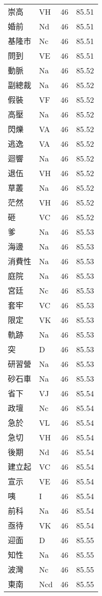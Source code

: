 \documentclass[twocolumn]{book}
\begin{document}
\begin{supertabular}{llrr}
崇高 & VH & 46 &  85.51\\
婚前 & Nd & 46 &  85.51\\
基隆市 & Nc & 46 &  85.51\\
問到 & VE & 46 &  85.51\\
動脈 & Na & 46 &  85.52\\
副總裁 & Na & 46 &  85.52\\
假裝 & VF & 46 &  85.52\\
高壓 & Na & 46 &  85.52\\
閃爍 & VA & 46 &  85.52\\
逃逸 & VA & 46 &  85.52\\
迴響 & Na & 46 &  85.52\\
退伍 & VH & 46 &  85.52\\
草叢 & Na & 46 &  85.52\\
茫然 & VH & 46 &  85.52\\
砸 & VC & 46 &  85.52\\
爹 & Na & 46 &  85.53\\
海邊 & Na & 46 &  85.53\\
消費性 & Na & 46 &  85.53\\
庭院 & Na & 46 &  85.53\\
宮廷 & Nc & 46 &  85.53\\
套牢 & VC & 46 &  85.53\\
限定 & VK & 46 &  85.53\\
軌跡 & Na & 46 &  85.53\\
突 & D & 46 &  85.53\\
研習營 & Na & 46 &  85.53\\
砂石車 & Na & 46 &  85.53\\
省下 & VJ & 46 &  85.54\\
政壇 & Nc & 46 &  85.54\\
急於 & VL & 46 &  85.54\\
急切 & VH & 46 &  85.54\\
後期 & Nd & 46 &  85.54\\
建立起 & VC & 46 &  85.54\\
宣示 & VE & 46 &  85.54\\
咦 & I & 46 &  85.54\\
前科 & Na & 46 &  85.54\\
亟待 & VK & 46 &  85.54\\
迎面 & D & 46 &  85.55\\
知性 & Na & 46 &  85.55\\
波灣 & Nc & 46 &  85.55\\
東南 & Ncd & 46 &  85.55\\

\end{supertabular}
\end{document}
